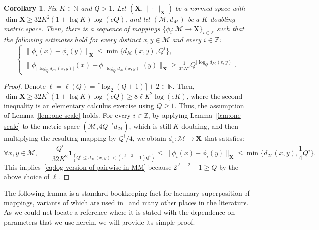 \documentclass[11pt,reqno]{amsart}
\newtheorem{corollary}[theorem]{Corollary}
\newcommand{\Z}{\mathbb{Z}}
\newcommand{\N}{\mathbb{N}}
\renewcommand{\le}{\leqslant}
\renewcommand{\ge}{\geqslant}
\newcommand{\X}{\mathbf X}
\newcommand{\MM}{\mathcal{M}}
\newcommand{\1}{\mathbf{1}}
\begin{document}
\begin{corollary}\label{cor:all scales} Fix  $K\in \N$ and $Q>1$. Let $(\X,\|\cdot\|_\X)$ be a normed space with $\dim\X\ge 32K^2(1+\log K)\log(eQ)$, and let $(\MM,d_\MM)$ be a $K$-doubling metric space. Then,  there is a sequence of mappings   $\{\phi_i:\MM\to \X\}_{i\in \Z}$ such that the following estimates hold for every distinct $x,y\in \MM$ and every $i\in \Z$: 
\begin{equation}\label{eq:log version of pairwise in MM}
   \left\{\begin{array}{ll} \|\phi_i(x)-\phi_i(y)\|_\X\le \min\big\{d_\MM(x,y), Q^i\big\},\\
\|\phi_{\lfloor \log_Q d_\MM(x,y)\rfloor}(x)-\phi_{\lfloor \log_Q d_\MM(x,y)\rfloor}(y)\|_\X\ge \frac{1}{32K^2} Q^{\lfloor \log_Q d_\MM(x,y)\rfloor}. \end{array}\right.
\end{equation}
\end{corollary}

\begin{proof} Denote $\ell=\ell(Q)=\lceil \log_2(Q+1)\rceil+2\in \N$.   Then, $\dim\X\ge 32K^2(1+\log K)\log(eQ)\ge 8\ell K^2\log(eK)$, where the second inequality is an elementary calculus exercise using $Q\ge 1$. Thus, the assumption of Lemma~\ref{lem:one scale} holds.  For every $i\in \Z$, by applying  Lemma~\ref{lem:one scale}  to the metric space $(\MM,4Q^{-i}d_\MM)$, which is still $K$-doubling, and then multiplying the resulting mapping by $Q^i/4$, we obtain $\phi_i:\MM\to \X$ that satisfies:  
\begin{equation*}\label{eq:ell to Q}
\forall x,y\in \MM,\qquad \frac{Q^i}{32K^2}\1_{\left\{Q^i\le d_\MM(x,y)< (2^{\ell-2}-1)Q^i\right\}}\le \|\phi_i(x)-\phi_i(y)\|_\X\le \min \Big\{d_\MM(x,y), \frac14 Q^i\Big\}. 
\end{equation*}
This implies~\eqref{eq:log version of pairwise in MM} because $2^{\ell-2}-1\ge Q$ by the above choice of $\ell$. 
\end{proof}


 The following lemma is a standard bookkeeping fact for lacunary  superposition of mappings, variants of which are used in~\cite{Assouad} and many other places in the literature. As we could not locate a reference where it is stated  with the dependence on parameters that we use herein, we will provide its simple proof.    
\end{document}
